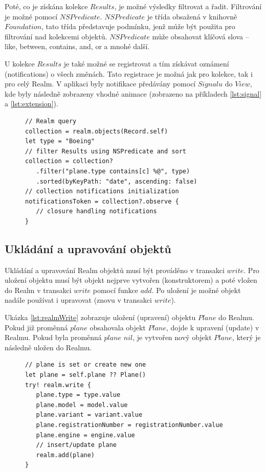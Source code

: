 \documentclass[thesis=M,czech]{FITthesis}[2012/06/26]
\begin{document}
Poté, co je získána kolekce $Results$, je možné výsledky filtrovat a řadit. Filtrování je možné pomocí $NSPredicate$. \cite{realmDocs} $NSPredicate$ je třída obsažená v knihovně $Foundation$, tato třída představuje podmínku, jenž může být použita pro filtrování nad kolekcemi objektů. $NSPredicate$ může obsahovat klíčová slova -- like, between, contains, and, or a mnohé další. \cite{predicate}

U kolekce $Results$ je také možné se registrovat a tím získávat oznámení (notifications) o všech změnách. Tato registrace je možná jak pro kolekce, tak i pro celý Realm. \cite{realmDocs} V aplikaci byly notifikace předávány pomocí $Signalu$ do $View$, kde byly následně zobrazeny vhodné animace (zobrazeno na příkladech \ref{lst:signal} a \ref{lst:extension}).

\begin{figure}
\begin{minipage}{\linewidth}
\begin{lstlisting}[caption={Ukázka dotazu v Realmu},label={lst:realm}]
// Realm query
collection = realm.objects(Record.self)
let type = "Boeing"
// filter Results using NSPredicate and sort
collection = collection?
   .filter("plane.type contains[c] %@", type)
   .sorted(byKeyPath: "date", ascending: false)
// collection notifications initialization
notificationsToken = collection?.observe {
   // closure handling notifications
}
\end{lstlisting}
\end{minipage}
\end{figure}

\subsection{Ukládání a upravování objektů}
Ukládání a upravování Realm objektů musí být prováděno v transakci $write$. Pro uložení objektu musí být objekt nejprve vytvořen (konstruktorem) a poté vložen do Realm v transakci $write$ pomocí funkce $add$. Po uložení je možné objekt nadále používat i upravovat (znovu v transakci $write$). \cite{realmDocs}

Ukázka \ref{lst:realmWrite} zobrazuje uložení (upravení) objektu $Plane$ do Realmu. Pokud již proměnná $plane$ obsahovala objekt $Plane$, dojde k upravení (update) v Realmu. Pokud byla proměnná $plane$ $nil$, je vytvořen nový objekt $Plane$, který je následně uložen do Realmu.

\begin{figure}
\begin{minipage}{\linewidth}
\begin{lstlisting}[caption={Ukázka zápisu/úpravy Realm objektu},label={lst:realmWrite}]
// plane is set or create new one
let plane = self.plane ?? Plane()
try! realm.write {
   plane.type = type.value
   plane.model = model.value
   plane.variant = variant.value
   plane.registrationNumber = registrationNumber.value
   plane.engine = engine.value
   // insert/update plane      
   realm.add(plane)
}
\end{lstlisting}
\end{minipage}
\end{figure}
	
\end{document}
